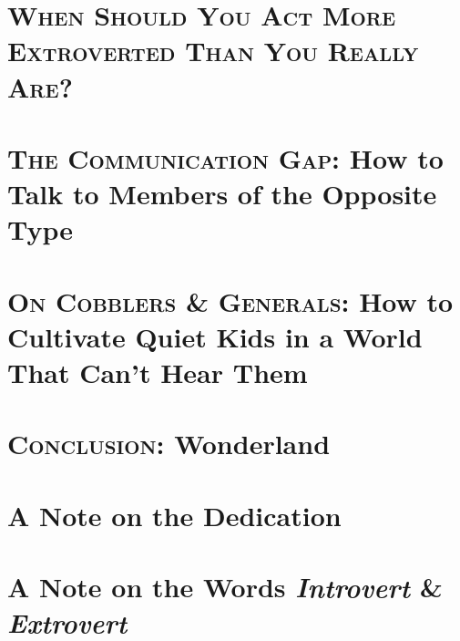 \documentclass[oneside]{article}
\numberwithin{equation}{section}
\begin{document}
\section{\textsc{When Should You Act More Extroverted Than You Really Are?}}


\section{\textsc{The Communication Gap}: How to Talk to Members of the Opposite Type}


\section{\textsc{On Cobblers \& Generals}: How to Cultivate Quiet Kids in a World That Can't Hear Them}


\section{\textsc{Conclusion}: Wonderland}


\section{A Note on the Dedication}


\section{A Note on the Words \textit{Introvert} \& \textit{Extrovert}}


\printbibliography[heading=bibintoc]
\end{document}
